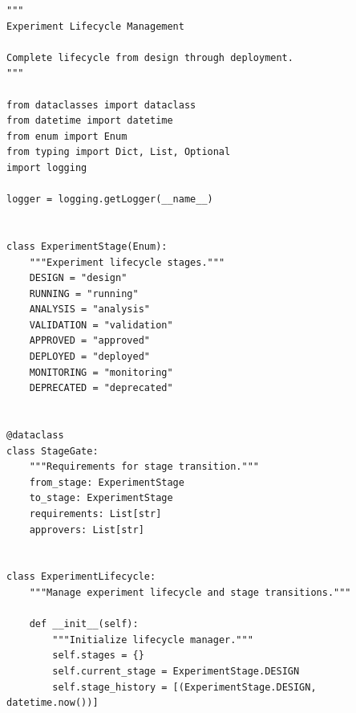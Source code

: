 \begin{lstlisting}[style=python, caption={Experiment lifecycle management}]
"""
Experiment Lifecycle Management

Complete lifecycle from design through deployment.
"""

from dataclasses import dataclass
from datetime import datetime
from enum import Enum
from typing import Dict, List, Optional
import logging

logger = logging.getLogger(__name__)


class ExperimentStage(Enum):
    """Experiment lifecycle stages."""
    DESIGN = "design"
    RUNNING = "running"
    ANALYSIS = "analysis"
    VALIDATION = "validation"
    APPROVED = "approved"
    DEPLOYED = "deployed"
    MONITORING = "monitoring"
    DEPRECATED = "deprecated"


@dataclass
class StageGate:
    """Requirements for stage transition."""
    from_stage: ExperimentStage
    to_stage: ExperimentStage
    requirements: List[str]
    approvers: List[str]


class ExperimentLifecycle:
    """Manage experiment lifecycle and stage transitions."""

    def __init__(self):
        """Initialize lifecycle manager."""
        self.stages = {}
        self.current_stage = ExperimentStage.DESIGN
        self.stage_history = [(ExperimentStage.DESIGN, datetime.now())]


\end{lstlisting}
